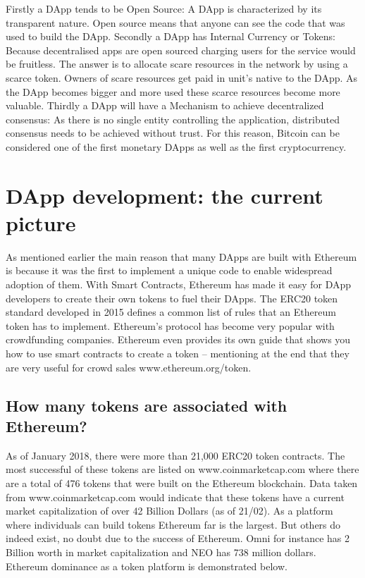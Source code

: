 \documentclass[]{book}
\theoremstyle{definition}
\theoremstyle{definition}
\theoremstyle{definition}
\theoremstyle{remark}
\begin{document}
Firstly a DApp tends to be Open Source: A DApp is characterized by its
transparent nature. Open source means that anyone can see the code that
was used to build the DApp. Secondly a DApp has Internal Currency or
Tokens: Because decentralised apps are open sourced charging users for
the service would be fruitless. The answer is to allocate scare
resources in the network by using a scarce token. Owners of scare
resources get paid in unit's native to the DApp. As the DApp becomes
bigger and more used these scarce resources become more valuable.
Thirdly a DApp will have a Mechanism to achieve decentralized consensus:
As there is no single entity controlling the application, distributed
consensus needs to be achieved without trust. For this reason, Bitcoin
can be considered one of the first monetary DApps as well as the first
cryptocurrency.

\section{DApp development: the current
picture}\label{dapp-development-the-current-picture}

As mentioned earlier the main reason that many DApps are built with
Ethereum is because it was the first to implement a unique code to
enable widespread adoption of them. With Smart Contracts, Ethereum has
made it easy for DApp developers to create their own tokens to fuel
their DApps. The ERC20 token standard developed in 2015 defines a common
list of rules that an Ethereum token has to implement. Ethereum's
protocol has become very popular with crowdfunding companies. Ethereum
even provides its own guide that shows you how to use smart contracts to
create a token -- mentioning at the end that they are very useful for
crowd sales www.ethereum.org/token.

\subsection{How many tokens are associated with
Ethereum?}\label{how-many-tokens-are-associated-with-ethereum}

As of January 2018, there were more than 21,000 ERC20 token contracts.
The most successful of these tokens are listed on www.coinmarketcap.com
where there are a total of 476 tokens that were built on the Ethereum
blockchain. Data taken from www.coinmarketcap.com would indicate that
these tokens have a current market capitalization of over 42 Billion
Dollars (as of 21/02). As a platform where individuals can build tokens
Ethereum far is the largest. But others do indeed exist, no doubt due to
the success of Ethereum. Omni for instance has 2 Billion worth in market
capitalization and NEO has 738 million dollars. Ethereum dominance as a
token platform is demonstrated below.
\end{document}
